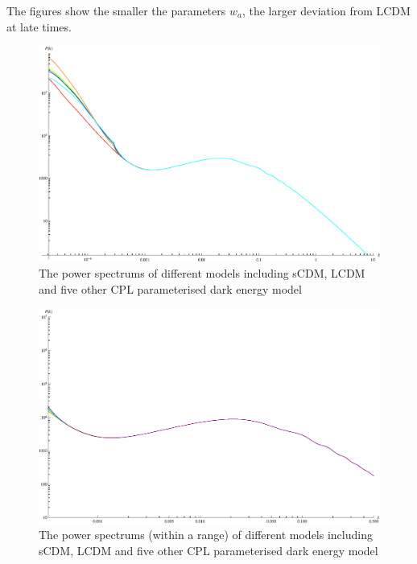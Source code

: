 \documentclass{article}
\begin{document}
The figures show the smaller the parameters $w_a$, the larger deviation from LCDM at late times.




\begin{figure}[!htbp]
\centering
\includegraphics[width=400pt]{CPL_PowerSpectrums.eps}
\caption{The power spectrums of different models including sCDM, LCDM and five other CPL parameterised dark energy model}\label{fig:CPL_PowerSpectrums}
\end{figure}





\begin{figure}[!htbp]
\centering
\includegraphics[width=400pt]{CPL_PowerSpectrums_Cut.eps}
\caption{The power spectrums (within a range) of different models including sCDM, LCDM and five other CPL parameterised dark energy model}\label{fig:CPL_PowerSpectrums_Cut}
\end{figure}
\end{document}
